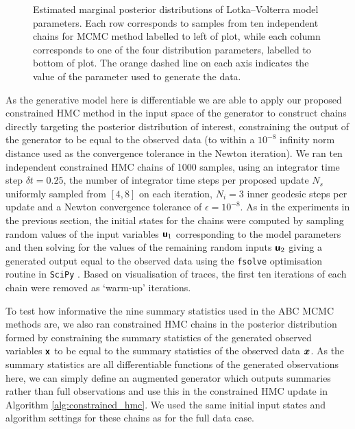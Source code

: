 \begin{figure}
\centering
{}
\caption[Lotka--Volterra model posterior histograms (2).]{Estimated marginal posterior distributions of Lotka--Volterra model parameters. Each row corresponds to samples from ten independent chains for \ac{MCMC} method labelled to left of plot, while each column corresponds to one of the four distribution parameters, labelled to bottom of plot. The orange dashed line on each axis indicates the value of the parameter used to generate the data.}
\label{fig:lotka-volterra-param-posterior}
\end{figure}

As the generative model here is differentiable we are able to apply our proposed constrained \ac{HMC} method in the input space of the generator to construct chains directly targeting the posterior distribution of interest, constraining the output of the generator to be equal to the observed data (to within a $10^{-8}$ infinity norm distance used as the convergence tolerance in the Newton iteration). We ran ten independent constrained \ac{HMC} chains of 1000 samples, using an integrator time step $\delta t = 0.25$, the number of integrator time steps per proposed update $N_s$ uniformly sampled from $[4,8]$ on each iteration, $N_i=3$ inner geodesic steps per update and a Newton convergence tolerance of $\epsilon=10^{-8}$. As in the experiments in the previous section, the initial states for the chains were computed by sampling random values of the input variables $\boldsymbol{\mathsf{u}}_1$ corresponding to the model parameters and then solving for the values of the remaining random inputs $\boldsymbol{\mathsf{u}}_2$ giving a generated output equal to the observed data using the \texttt{fsolve} optimisation routine in \texttt{SciPy} \citep{jones2001scipy}. Based on visualisation of traces, the first ten iterations of each chain were removed as `warm-up' iterations.

To test how informative the nine summary statistics used in the \ac{ABC} \ac{MCMC} methods are, we also ran constrained \ac{HMC} chains in the posterior distribution formed by constraining the summary statistics of the generated observed variables $\boldsymbol{\mathsf{x}}$ to be equal to the summary statistics of the observed data $\boldsymbol{x}$. As the summary statistics are all differentiable functions of the generated observations here, we can simply define an augmented generator which outputs summaries rather than full observations and use this in the constrained \ac{HMC} update in Algorithm \ref{alg:constrained_hmc}. We used the same initial input states and algorithm settings for these chains as for the full data case.

